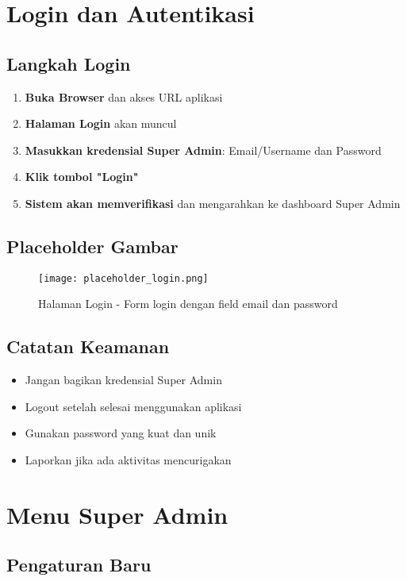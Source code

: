 \documentclass[12pt,a4paper]{article}
\begin{document}
\section{Login dan Autentikasi}

\subsection{Langkah Login}
\begin{enumerate}
\item \textbf{Buka Browser} dan akses URL aplikasi
\item \textbf{Halaman Login} akan muncul
\item \textbf{Masukkan kredensial Super Admin}: Email/Username dan Password
\item \textbf{Klik tombol "Login"}
\item \textbf{Sistem akan memverifikasi} dan mengarahkan ke dashboard Super Admin
\end{enumerate}

\subsection{Placeholder Gambar}
\begin{figure}[H]
\centering
\texttt{[image: placeholder\_login.png]}
\caption{Halaman Login - Form login dengan field email dan password}
\label{fig:login}
\end{figure}

\subsection{Catatan Keamanan}
\begin{itemize}
\item Jangan bagikan kredensial Super Admin
\item Logout setelah selesai menggunakan aplikasi
\item Gunakan password yang kuat dan unik
\item Laporkan jika ada aktivitas mencurigakan
\end{itemize}

\section{Menu Super Admin}

\subsection{Pengaturan Baru}
\end{document}
